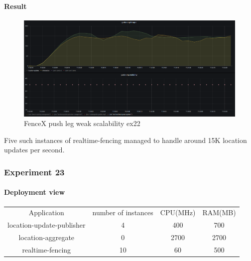 \documentclass[a4]{report}
\begin{document}
    \paragraph{Result}
    \begin{figure}[ht]
        \caption{FenceX push leg weak scalability ex22}
        \label{fig:ex22}
        \includegraphics[scale=0.4]{images/evaluation/ex22-benchmarking-ongoing-1per2sec.png}
    \end{figure}
    Five such instances of realtime-fencing managed to handle around 15K location updates per second.

    \subsubsection{Experiment 23}
    \paragraph{Deployment view}
    \begin{center}
        \begin{tabular}{ c c c c }
            Application               &  number of instances     & CPU(MHz)  & RAM(MB)    \\
            location-update-publisher &          4               & 400       &   700      \\
            location-aggregate        &          0               & 2700      &   2700     \\
            realtime-fencing          &          10              & 60       &   500       \\
        \end{tabular}
    \end{center}
\end{document}
